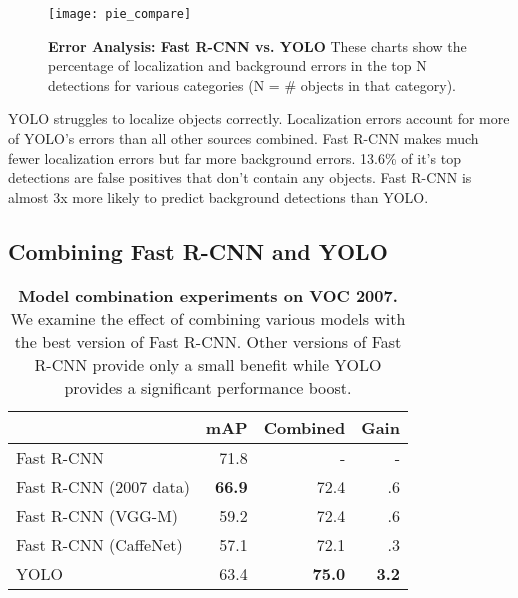 \begin{figure}[t]
 \centering
 \texttt{[image: pie\_compare]}
 \caption{\small \textbf{Error Analysis: Fast R-CNN vs. YOLO} These charts show the percentage of localization and background errors in the top N detections for various categories (N = \# objects in that category).}
 \label{errors}
 \end{figure}

YOLO struggles to localize objects correctly. Localization errors account for more of YOLO's errors than all other sources combined. Fast R-CNN makes much fewer localization errors but far more background errors. 13.6\% of it's top detections are false positives that don't contain any objects. Fast R-CNN is almost 3x more likely to predict background detections than YOLO.

\subsection{Combining Fast R-CNN and YOLO}

\begin{table}[b]
\begin{center}
\begin{tabular}{lrrr}
 & mAP & Combined & Gain \\
\hline
Fast R-CNN & 71.8 & - & - \\
\hline
Fast R-CNN (2007 data) & \textbf{66.9} & 72.4 & .6 \\
Fast R-CNN (VGG-M) & 59.2 & 72.4 & .6 \\
Fast R-CNN (CaffeNet) & 57.1 & 72.1 & .3\\
YOLO & 63.4 & \textbf{75.0} & \textbf{3.2}\\
\end{tabular}
\end{center}
\caption{\small \textbf{Model combination experiments on VOC 2007.} We examine the effect of combining various models with the best version of Fast R-CNN. Other versions of Fast R-CNN provide only a small benefit while YOLO provides a significant performance boost.}
\label{combine}
\end{table}

